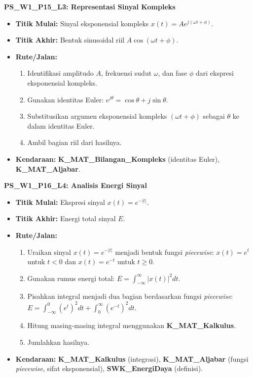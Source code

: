 \documentclass[
  letterpaper,
  DIV=11,
  numbers=noendperiod]{scrreprt}
\providecommand{\tightlist}{%
  \setlength{\itemsep}{0pt}\setlength{\parskip}{0pt}}
\begin{document}
\textbf{PS\_W1\_P15\_L3: Representasi Sinyal Kompleks}

\begin{itemize}
\tightlist
\item
  \textbf{Titik Mulai:} Sinyal eksponensial kompleks
  \(x(t) = A e^{j(\omega t + \phi)}\).
\item
  \textbf{Titik Akhir:} Bentuk sinusoidal riil
  \(A \cos(\omega t + \phi)\).
\item
  \textbf{Rute/Jalan:}

  \begin{enumerate}
  \def\labelenumi{\arabic{enumi}.}
  \tightlist
  \item
    Identifikasi amplitudo \(A\), frekuensi sudut \(\omega\), dan fase
    \(\phi\) dari ekspresi eksponensial kompleks.
  \item
    Gunakan identitas Euler:
    \(e^{j\theta} = \cos\theta + j \sin\theta\).
  \item
    Substitusikan argumen eksponensial kompleks \((\omega t + \phi)\)
    sebagai \(\theta\) ke dalam identitas Euler.
  \item
    Ambil bagian riil dari hasilnya.
  \end{enumerate}
\item
  \textbf{Kendaraan:} \textbf{K\_MAT\_Bilangan\_Kompleks} (identitas
  Euler), \textbf{K\_MAT\_Aljabar}.
\end{itemize}

\textbf{PS\_W1\_P16\_L4: Analisis Energi Sinyal}

\begin{itemize}
\tightlist
\item
  \textbf{Titik Mulai:} Ekspresi sinyal \(x(t) = e^{-|t|}\).
\item
  \textbf{Titik Akhir:} Energi total sinyal \(E\).
\item
  \textbf{Rute/Jalan:}

  \begin{enumerate}
  \def\labelenumi{\arabic{enumi}.}
  \tightlist
  \item
    Uraikan sinyal \(x(t) = e^{-|t|}\) menjadi bentuk fungsi
    \emph{piecewise}: \(x(t) = e^t\) untuk \(t<0\) dan \(x(t) = e^{-t}\)
    untuk \(t \ge 0\).
  \item
    Gunakan rumus energi total:
    \(E = \int_{-\infty}^{\infty} |x(t)|^2 dt\).
  \item
    Pisahkan integral menjadi dua bagian berdasarkan fungsi
    \emph{piecewise}:
    \(E = \int_{-\infty}^{0} (e^t)^2 dt + \int_{0}^{\infty} (e^{-t})^2 dt\).
  \item
    Hitung masing-masing integral menggunakan \textbf{K\_MAT\_Kalkulus}.
  \item
    Jumlahkan hasilnya.
  \end{enumerate}
\item
  \textbf{Kendaraan:} \textbf{K\_MAT\_Kalkulus} (integrasi),
  \textbf{K\_MAT\_Aljabar} (fungsi \emph{piecewise}, sifat
  eksponensial), \textbf{SWK\_EnergiDaya} (definisi).
\end{itemize}
\end{document}
